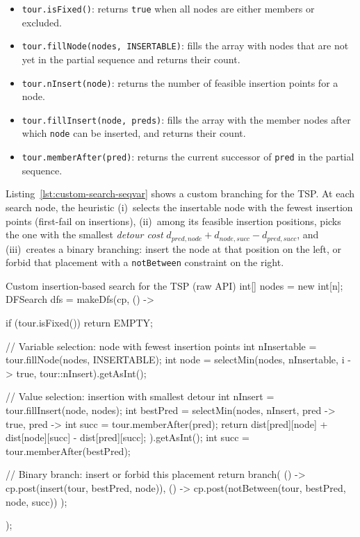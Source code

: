 \documentclass[11pt, a4paper]{scrartcl}
\begin{document}
\begin{itemize}
    \item \texttt{tour.isFixed()}: returns \texttt{true} when all nodes are either members or excluded.
    \item \texttt{tour.fillNode(nodes, INSERTABLE)}: fills the array with nodes that are not yet in the partial sequence and returns their count.
    \item \texttt{tour.nInsert(node)}: returns the number of feasible insertion points for a node.
    \item \texttt{tour.fillInsert(node, preds)}: fills the array with the member nodes after which \texttt{node} can be inserted, and returns their count.
    \item \texttt{tour.memberAfter(pred)}: returns the current successor of \texttt{pred} in the partial sequence.
\end{itemize}

Listing~\ref{lst:custom-search-seqvar} shows a custom branching for the TSP. At each search node, the heuristic (i)~selects the insertable node with the fewest insertion points (first-fail on insertions), (ii)~among its feasible insertion positions, picks the one with the smallest \emph{detour cost} $d_{\mathit{pred},\mathit{node}} + d_{\mathit{node},\mathit{succ}} - d_{\mathit{pred},\mathit{succ}}$, and (iii)~creates a binary branching: insert the node at that position on the left, or forbid that placement with a \texttt{notBetween} constraint on the right.

\begin{codebox}[label={lst:custom-search-seqvar}]{Custom insertion-based search for the TSP (raw API)}
int[] nodes = new int[n];
DFSearch dfs = makeDfs(cp, () -> {
    if (tour.isFixed()) return EMPTY;

    // Variable selection: node with fewest insertion points
    int nInsertable = tour.fillNode(nodes, INSERTABLE);
    int node = selectMin(nodes, nInsertable,
        i -> true, tour::nInsert).getAsInt();

    // Value selection: insertion with smallest detour
    int nInsert = tour.fillInsert(node, nodes);
    int bestPred = selectMin(nodes, nInsert,
        pred -> true,
        pred -> {
            int succ = tour.memberAfter(pred);
            return dist[pred][node] + dist[node][succ]
                 - dist[pred][succ];
        }).getAsInt();
    int succ = tour.memberAfter(bestPred);

    // Binary branch: insert or forbid this placement
    return branch(
        () -> cp.post(insert(tour, bestPred, node)),
        () -> cp.post(notBetween(tour, bestPred, node, succ))
    );
});
\end{codebox}
\end{document}

